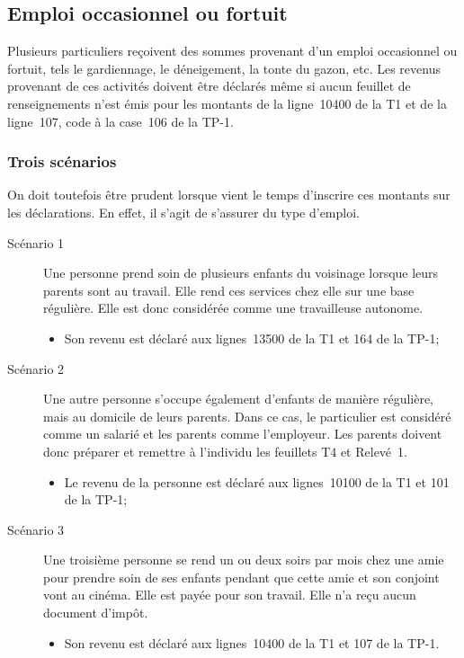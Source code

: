 \subsection{Emploi occasionnel ou fortuit}
Plusieurs particuliers reçoivent des sommes provenant d'un emploi occasionnel ou fortuit, tels le gardiennage, le déneigement, la tonte du gazon, etc. Les revenus provenant de ces activités doivent être déclarés même si aucun feuillet de renseignements n'est émis pour les montants de la ligne~10400 de la T1 et de la ligne~107, code  \fg{} à la case~106 de la TP-1.

\subsubsection{Trois scénarios}
On doit toutefois être prudent lorsque vient le temps d'inscrire ces montants sur les déclarations. En effet, il s'agit de s'assurer du type d'emploi.
\begin{description}
	\item[Scénario 1] Une personne prend soin de plusieurs enfants du voisinage lorsque leurs parents sont au travail. Elle rend ces services chez elle sur une base régulière. Elle est donc considérée comme une travailleuse autonome.
	\begin{itemize}
		\item Son revenu est déclaré aux lignes~13500 de la T1 et 164 de la TP-1;
	\end{itemize}
	\item[Scénario 2] Une autre personne s'occupe également d'enfants de manière régulière, mais au domicile de leurs parents. Dans ce cas, le particulier est considéré comme un salarié et les parents comme l'employeur. Les parents doivent donc préparer et remettre à l'individu les feuillets T4 et Relevé~1.
	\begin{itemize}
		\item Le revenu de la personne est déclaré aux lignes~10100 de la T1 et 101 de la TP-1;
	\end{itemize}
	\item[Scénario 3] 
	Une troisième personne se rend un ou deux soirs par mois chez une amie pour prendre soin de ses enfants pendant que cette amie et son conjoint vont au cinéma. Elle est payée pour son travail. Elle n'a reçu aucun document d'impôt.
	\begin{itemize}
		\item Son revenu est déclaré aux lignes~10400 de la T1 et 107 de la TP-1.
	\end{itemize}
\end{description}


